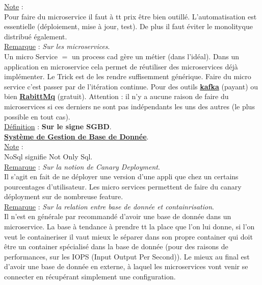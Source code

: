 \documentclass[a4paper,12pt,twoside]{article}
\newcommand{\urlcolor}{magenta}  %
\newcommand{\keycolor}{purple} %
\newcommand{\rem}[2]{\noindent\underline{Remarque} : \textit{#1}.\\ \indent #2}
\newcommand{\note}[1]{\noindent\underline{Note} : \\ \indent #1}
\newcommand{\defi}[2]{\noindent\underline{Définition} : \textbf{#1}.\\ \indent #2}
\newcommand{\keyref}[2]{\hypersetup{urlcolor=\keycolor} \href{#1}{\textbf{#2}}\hypersetup{urlcolor=\urlcolor}}
\begin{document}
\note{Pour faire du microservice il faut à tt prix être bien outillé. L'automatisation est essentielle (déploiement, mise à jour, test). De plus il faut éviter le monolityque distribué également.}\\

\rem{Sur les microservices}{Un micro Service $=$ un process cad gère un métier (dans l'idéal). Dans un application en microservice cela permet de réutiliser des microservices déjà implémenter. Le Trick est de les rendre suffisemment générique. Faire du micro service c'est passer par de l'itération continue. Pour des outils \keyref{https://developer.okta.com/blog/2020/01/22/kafka-microservices}{kafka} (payant) ou bien \keyref{https://www.rabbitmq.com/}{RabittMq} (gratuit). Attention : il n'y a aucune raison de faire du microservices si ces derniers ne sont pas indépendants les uns des autres (le plus possible en tout cas).}\\

\defi{Sur le signe SGBD}{\keyref{https://fr.wikipedia.org/wiki/Syst\%C3\%A8me\_de\_gestion\_de\_base\_de\_donn\%C3\%A9es}{Système de Gestion de Base de Donnée}.}\\

\note{NoSql signifie Not Only Sql.}\\

\rem{Sur la notion de Canary Deployment}{Il s'agit en fait de ne déployer une version d'une appli que chez un certains pourcentages d'utilisateur. Les micro services permettent de faire du canary déployment sur de nombreuse feature.}\\

\rem{Sur la relation entre base de donnée et containrisation}{Il n'est en générale par recommandé d'avoir une base de donnée dans un microservice. La base à tendance à prendre tt la place que l'on lui donne, si l'on veut le containeriser il vaut mieux le séparer dans son propre container qui doit être un container spécialisé dans la base de donnée (pour des raisons de performances, sur les IOPS (Input Output Per Second)). Le mieux au final est d'avoir une base de donnée en externe, à laquel les microservices vont venir se connecter en récupérant simplement une configuration.}\\




\end{document}
